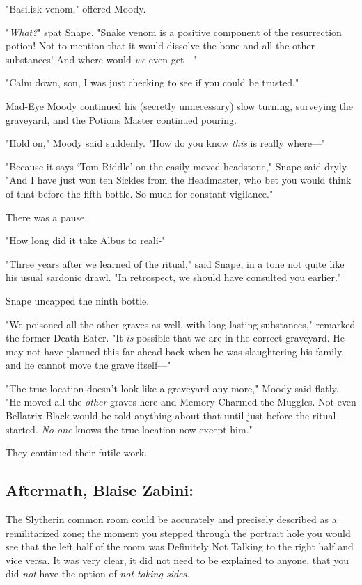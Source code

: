 "Basilisk venom," offered Moody.

"\emph{What?}" spat Snape. "Snake venom is a positive component of the 
resurrection potion! Not to mention that it would dissolve the bone and all the 
other substances! And where would \emph{we} even get---"

"Calm down, son, I was just checking to see if you could be trusted."

Mad-Eye Moody continued his (secretly unnecessary) slow turning, surveying the 
graveyard, and the Potions Master continued pouring.

"Hold on," Moody said suddenly. "How do you know \emph{this} is really where---"

"Because it says `Tom Riddle' on the easily moved headstone," Snape said dryly. 
"And I have just won ten Sickles from the Headmaster, who bet you would think 
of that before the fifth bottle. So much for constant vigilance."

There was a pause.

"How long did it take Albus to reali-"

"Three years after we learned of the ritual," said Snape, in a tone not quite 
like his usual sardonic drawl. "In retrospect, we should have consulted you 
earlier."

Snape uncapped the ninth bottle.

"We poisoned all the other graves as well, with long-lasting substances," 
remarked the former Death Eater. "It \emph{is} possible that we are in the 
correct graveyard. He may not have planned this far ahead back when he was 
slaughtering his family, and he cannot move the grave itself---"

"The true location doesn't look like a graveyard any more," Moody said flatly. 
"He moved all the \emph{other} graves here and Memory-Charmed the Muggles. Not 
even Bellatrix Black would be told anything about that until just before the 
ritual started. \emph{No one} knows the true location now except him."

They continued their futile work.
\sbreak
\subsection{Aftermath, Blaise Zabini:}

The Slytherin common room could be accurately and precisely described as a 
remilitarized zone; the moment you stepped through the portrait hole you would 
see that the left half of the room was Definitely Not Talking to the right half 
and vice versa. It was very clear, it did not need to be explained to anyone, 
that you did \emph{not} have the option of \emph{not taking sides}.


